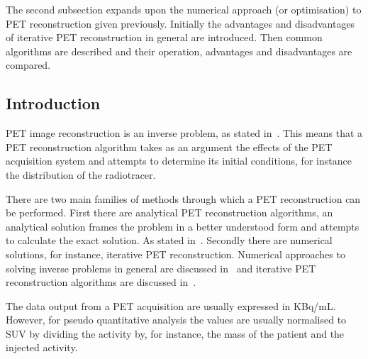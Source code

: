         The second subsection expands upon the numerical approach (or optimisation) to \gls{PET} reconstruction given previously. Initially the advantages and disadvantages of iterative \gls{PET} reconstruction in general are introduced. Then common algorithms are described and their operation, advantages and disadvantages are compared. 
        
        \subsection{Introduction} \label{sec:pet_image_reconstruction_introduction}
            \gls{PET} image reconstruction is an inverse problem, as stated in~. This means that a \gls{PET} reconstruction algorithm takes as an argument the effects of the \gls{PET} acquisition system and attempts to determine its initial conditions, for instance the distribution of the radiotracer.
            
            There are two main families of methods through which a \gls{PET} reconstruction can be performed. First there are analytical \gls{PET} reconstruction algorithms, an analytical solution frames the problem in a better understood form and attempts to calculate the exact solution. As stated in~. Secondly there are numerical solutions, for instance, iterative \gls{PET} reconstruction. Numerical approaches to solving inverse problems in general are discussed in~ and iterative \gls{PET} reconstruction algorithms are discussed in~.
            
            The data output from a \gls{PET} acquisition are usually expressed in \gls{KBq/mL}. However, for pseudo quantitative analysis the values are usually normalised to \gls{SUV} by dividing the activity by, for instance, the mass of the patient and the injected activity. %
        
